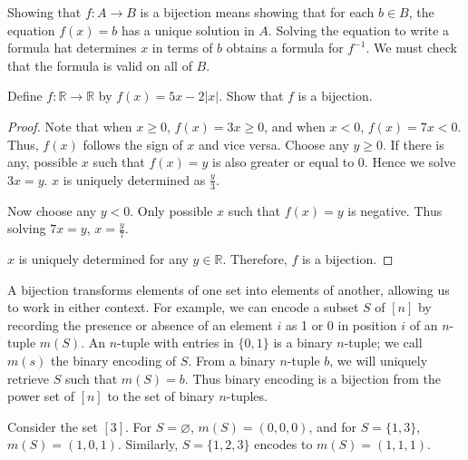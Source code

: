 \documentclass[../main.tex]{subfiles}
\begin{document}
Showing that $f: A \rightarrow B$ is a bijection means showing that for each $b \in B$, the equation $f(x) = b$ has a unique solution in $A$.
Solving the equation to write a formula hat determines $x$ in terms of $b$ obtains a formula for $f^{-1}$.
We must check that the formula is valid on all of $B$.

\begin{ex}
    Define $f: \mathbb{R} \rightarrow \mathbb{R}$ by $f(x) = 5x - 2|x|$.
    Show that $f$ is a bijection.
\end{ex}
\begin{proof}
    Note that when $x \geq 0$, $f(x) = 3x \geq 0$, and when $x < 0$, $f(x) = 7x < 0$.
    Thus, $f(x)$ follows the sign of $x$ and vice versa.
    Choose any $y \geq 0$.
    If there is any, possible $x$ such that $f(x) = y$ is also greater or equal to 0.
    Hence we solve $3x = y$.
    $x$ is uniquely determined as $\frac y3$.

    Now choose any $y < 0$.
    Only possible $x$ such that $f(x) = y$ is negative.
    Thus solving $7x = y$, $x = \frac y7$.

    $x$ is uniquely determined for any $y \in \mathbb R$.
    Therefore, $f$ is a bijection.
\end{proof}

A bijection transforms elements of one set into elements of another, allowing us to work in either context.
For example, we can encode a subset $S$ of $[n]$ by recording the presence or absence of an element $i$ as 1 or 0 in position $i$ of an $n$-tuple $m(S)$.
An $n$-tuple with entries in $\{0, 1\}$ is a \textsf{binary $n$-tuple}; we call $m(s)$ the \textsf{binary encoding} of $S$.
From a binary $n$-tuple $b$, we will uniquely retrieve $S$ such that $m(S) = b$.
Thus binary encoding is a bijection from the power set of $[n]$ to the set of binary $n$-tuples.
\begin{ex}
    Consider the set $[3]$.
    For $S = \varnothing$, $m(S) = (0,0,0)$, and for $S = \{1, 3\}$, $m(S) = (1, 0, 1)$.
    Similarly, $S = \{1,2,3\}$ encodes to $m(S) = (1,1,1)$.
\end{ex}
\end{document}
